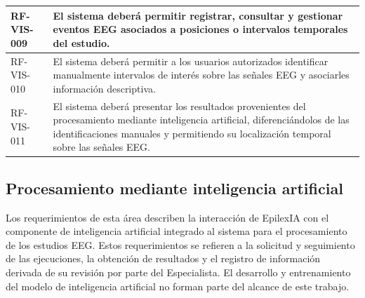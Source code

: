 \begin{longtable}{|p{}|p{}|}
    RF-VIS-009 &
    El sistema deberá permitir registrar, consultar y gestionar eventos EEG
    asociados a posiciones o intervalos temporales del estudio. \\
    \hline

    RF-VIS-010 &
    El sistema deberá permitir a los usuarios autorizados identificar
    manualmente intervalos de interés sobre las señales EEG y asociarles
    información descriptiva. \\
    \hline

    RF-VIS-011 &
    El sistema deberá presentar los resultados provenientes del procesamiento
    mediante inteligencia artificial, diferenciándolos de las identificaciones
    manuales y permitiendo su localización temporal sobre las señales EEG. \\
    \hline
\end{longtable}


\subsection{Procesamiento mediante inteligencia artificial}
\label{subsec:rf-ia}

Los requerimientos de esta área describen la interacción de EpilexIA con el
componente de inteligencia artificial integrado al sistema para el
procesamiento de los estudios EEG. Estos requerimientos se refieren a la
solicitud y seguimiento de las ejecuciones, la obtención de resultados y el
registro de información derivada de su revisión por parte del Especialista.
El desarrollo y entrenamiento del modelo de inteligencia artificial no forman
parte del alcance de este trabajo.

